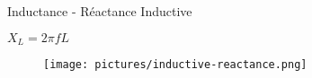 \begin{frame}{Inductance - Réactance Inductive}
    \begin{center}
        \Large{
            $X_L = 2 \pi f L$
        }
        \vspace{15pt}
        \begin{figure}
            \centering
            \texttt{[image: pictures/inductive-reactance.png]}
        \end{figure}
    \end{center}
\end{frame}



